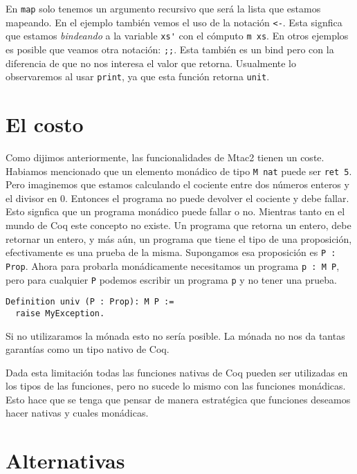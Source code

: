 En \lstinline{map} solo tenemos un argumento recursivo que será la lista que estamos mapeando.
En el ejemplo también vemos el uso de la notación \lstinline{<-}. Esta signfica que estamos \emph{bindeando} a la variable \lstinline{xs'} con el cómputo \lstinline{m xs}. En otros ejemplos es posible que veamos otra notación: \lstinline{;;}. Esta también es un bind pero con la diferencia de que no nos interesa el valor que retorna. Usualmente lo observaremos al usar \lstinline{print}, ya que esta función retorna \lstinline{unit}.

\section{El costo}

Como dijimos anteriormente, las funcionalidades de Mtac2 tienen un coste. Habiamos mencionado que un elemento monádico de tipo \lstinline{M nat} puede ser \lstinline{ret 5}. Pero imaginemos que estamos calculando el cociente entre dos números enteros y el divisor en 0. Entonces el programa no puede devolver el cociente y debe fallar. Esto signfica que un programa monádico puede fallar o no. Mientras tanto en el mundo de Coq este concepto no existe. Un programa que retorna un entero, debe retornar un entero, y más aún, un programa que tiene el tipo de una proposición, efectivamente es una prueba de la misma. Supongamos esa proposición es \lstinline{P : Prop}. Ahora para probarla monádicamente necesitamos un programa \lstinline{p : M P}, pero para cualquier \lstinline{P} podemos escribir un programa \lstinline{p} y no tener una prueba.
\begin{lstlisting}
Definition univ (P : Prop): M P :=
  raise MyException.
\end{lstlisting}

Si no utilizaramos la mónada esto no sería posible. La mónada no nos da tantas garantías como un tipo nativo de Coq.

Dada esta limitación todas las funciones nativas de Coq pueden ser utilizadas en los tipos de las funciones, pero no sucede lo mismo con las funciones monádicas. Esto hace que se tenga que pensar de manera estratégica que funciones deseamos hacer nativas y cuales monádicas.

\section{Alternativas}

